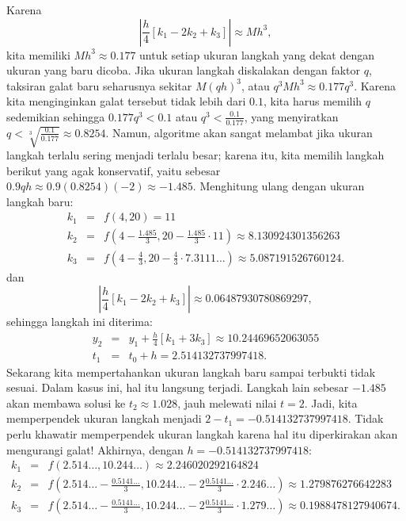 Karena 
\[
\left|\frac{h}{4}\left[k_{1}-2k_{2}+k_{3}\right]\right|\approx Mh^{3},
\]
kita memiliki $Mh^{3}\approx0.177$ untuk setiap ukuran langkah yang
dekat dengan ukuran yang baru dicoba. Jika ukuran langkah diskalakan
dengan faktor $q$, taksiran galat baru seharusnya sekitar $M(qh)^{3}$,
atau $q^{3}Mh^{3}\approx0.177q^{3}$. Karena kita menginginkan galat
tersebut tidak lebih dari $0.1$, kita harus memilih $q$ sedemikian
sehingga $0.177q^{3}<0.1$ atau $q^{3}<\frac{0.1}{0.177}$, yang menyiratkan
$q<\sqrt[3]{\frac{0.1}{0.177}}\approx0.8254$. Namun, algoritme akan
sangat melambat jika ukuran langkah terlalu sering menjadi terlalu
besar; karena itu, kita memilih langkah berikut yang agak konservatif,
yaitu sebesar $0.9qh\approx0.9(0.8254)(-2)\approx-1.485$. Menghitung
ulang dengan ukuran langkah baru:
\begin{eqnarray*}
k_{1} & = & f(4,20)=11\\
k_{2} & = & f\left(4-\frac{1.485}{3},20-\frac{1.485}{3}\cdot11\right)\approx8.130924301356263\\
k_{3} & = & f\left(4-\frac{4}{3},20-\frac{4}{3}\cdot7.3111\ldots\right)\approx5.087191526760124.
\end{eqnarray*}
dan
\[
\left|\frac{h}{4}\left[k_{1}-2k_{2}+k_{3}\right]\right|\approx0.06487930780869297,
\]
sehingga langkah ini diterima:
\begin{eqnarray*}
y_{2} & = & y_{1}+\frac{h}{4}\left[k_{1}+3k_{3}\right]\approx10.24469652063055\\
t_{1} & = & t_{0}+h=2.514132737997418.
\end{eqnarray*}
Sekarang kita mempertahankan ukuran langkah baru sampai terbukti tidak
sesuai. Dalam kasus ini, hal itu langsung terjadi. Langkah lain sebesar
$-1.485$ akan membawa solusi ke $t_{2}\approx1.028$, jauh melewati
nilai $t=2$. Jadi, kita memperpendek ukuran langkah menjadi $2-t_{1}=-0.514132737997418$.
Tidak perlu khawatir memperpendek ukuran langkah karena hal itu diperkirakan
akan mengurangi galat! Akhirnya, dengan $h=-0.514132737997418$:
\begin{eqnarray*}
k_{1} & = & f(2.514\ldots,10.244\ldots)\approx2.246020292164824\\
k_{2} & = & f\left(2.514\ldots-\frac{0.5141\ldots}{3},10.244\ldots-2\frac{0.5141\ldots}{3}\cdot2.246\ldots\right)\approx1.279876276642283\\
k_{3} & = & f\left(2.514\ldots-\frac{0.5141\ldots}{3},10.244\ldots-2\frac{0.5141\ldots}{3}\cdot1.279\ldots\right)\approx0.1988478127940674.
\end{eqnarray*}
